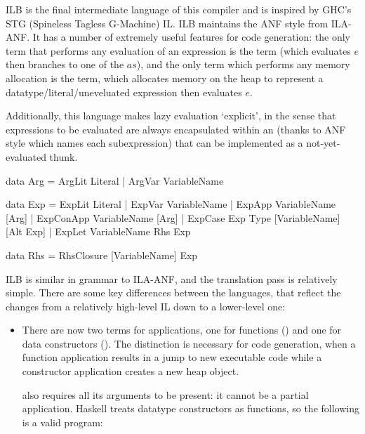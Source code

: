 \documentclass[dissertation.tex]{subfiles}
\begin{document}
{{        ILB is the final intermediate language of this compiler and is inspired by GHC's STG (Spineless Tagless
        G-Machine) IL. ILB maintains the ANF style from ILA-ANF. It has a number of extremely useful features for
        code generation: the only term that performs any evaluation of an expression is the  term (which evaluates \(e\) then branches to one of the \(as\)), and the only term which
        performs any memory allocation is the \haskell{ExpLit #\(v\ r\ e\)#} term, which allocates memory on the
        heap to represent a datatype/literal/uneveluated expression then evaluates \(e\).

        Additionally, this language makes lazy evaluation `explicit', in the sense that expressions to be evaluated
        are always encapsulated within an \haskell{RhsClosure} (thanks to ANF style which names each subexpression)
        that can be implemented as a not-yet-evaluated thunk.

        \begin{haskellfigure}
        data Arg = ArgLit Literal
                    | ArgVar VariableName

        data Exp = ExpLit Literal
                    | ExpVar VariableName
                    | ExpApp VariableName [Arg]
                    | ExpConApp VariableName [Arg]
                    | ExpCase Exp Type [VariableName] [Alt Exp]
                    | ExpLet VariableName Rhs Exp

        data Rhs = RhsClosure [VariableName] Exp
        \end{haskellfigure}

        ILB is similar in grammar to ILA-ANF, and the translation pass is relatively simple. There are some key
        differences between the languages, that reflect the changes from a relatively high-level IL down to a
        lower-level one:

        \begin{itemize}
        \item
        {

            There are now two terms for applications, one for functions () and one for data
            constructors (\haskell{ExpConApp}). The distinction is necessary for code generation, when a function
            application results in a jump to new executable code while a constructor application creates a new heap
            object.

             also requires all its arguments to be present: it cannot be a partial application.
            Haskell treats datatype constructors as functions, so the following is a valid program:

}
\end{itemize}}}
\end{document}
